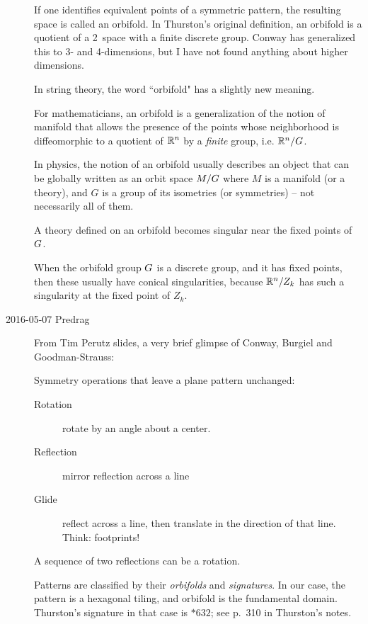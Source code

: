 \begin{description}
    If one identifies equivalent points of a symmetric pattern, the
    resulting space is called an orbifold. In Thurston's
    {original definition}, an orbifold is a quotient of a 2\dmn\ space
    with a finite discrete group. Conway has generalized this to 3- and
    4-dimensions, but I have not found anything about higher
    dimensions.

In string theory, the word ``orbifold" has a slightly new meaning.

%
For mathematicians, an orbifold is a generalization of the notion of
manifold that allows the presence of the points whose neighborhood is
diffeomorphic to a quotient of $\mathbb{R}^n$ by a \emph{finite} group, i.e.
$\mathbb{R}^n/G$.

In physics, the notion of an orbifold usually describes an object that
can be globally written as an orbit space $M/G$ where $M$ is a manifold
(or a theory), and $G$ is a group of its isometries (or symmetries) -- not
necessarily all of them.

A theory defined on an orbifold becomes singular near the fixed points of
$G$.

When the orbifold group $G$ is a discrete group, and it has fixed
points, then these usually have conical singularities, because
$\mathbb{R}^n/Z_k$ has such a singularity at the fixed point of $Z_k$.

\item[2016-05-07 Predrag] From Tim Perutz
{slides}, a very brief glimpse of Conway, Burgiel and
Goodman-Strauss:

Symmetry operations that leave a plane pattern unchanged:
\begin{description}
  \item[Rotation] rotate by an angle about a center.
  \item[Reflection] mirror reflection across a line
  \item[Glide] reflect across a line, then translate in the
      direction of that line. Think: footprints!
\end{description}
A sequence of two reflections can be a rotation.

Patterns are classified by their \emph{orbifolds} and \emph{signatures}.
In our case, the pattern is a hexagonal tiling, and orbifold is the
fundamental domain. Thurston's signature in that case is $*632$; see
p.~310 in Thurston's 
{notes}.


\end{description}
